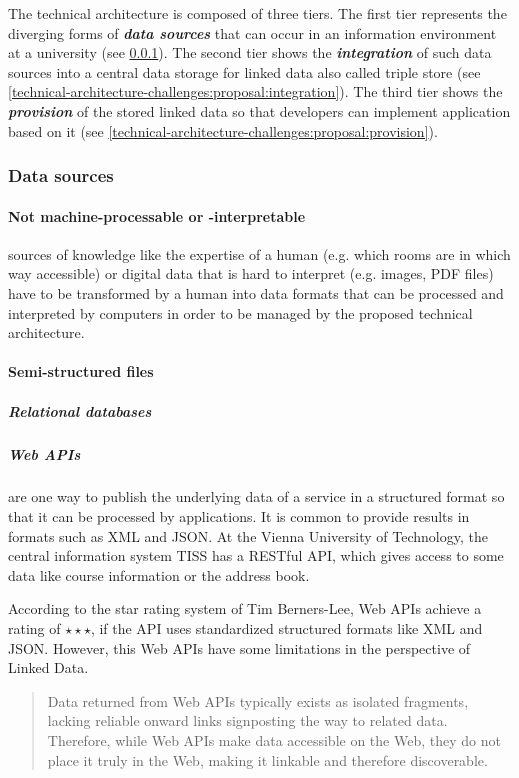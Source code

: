 \documentclass{article}
\begin{document}
The technical architecture is composed of three tiers. The first tier represents the diverging forms of \textbf{\textit{data sources}} that can occur in an information environment at a university (see \ref{technical-architecture-challenges:proposal:data-source}). The second tier shows the \textbf{\textit{integration}} of such data sources into a central data storage for linked data also called triple store (see \ref{technical-architecture-challenges:proposal:integration}). The third tier shows the \textbf{\textit{provision}} of the stored linked data so that developers can implement application based on it (see \ref{technical-architecture-challenges:proposal:provision}). 

\subsubsection{Data sources}
\label{technical-architecture-challenges:proposal:data-source}

\paragraph{Not machine-processable or -interpretable} sources of knowledge like the expertise of a human (e.g. which rooms are in which way accessible) or digital data that is hard to interpret (e.g. images, PDF files) have to be transformed by a human into data formats that can be processed and interpreted by computers in order to be managed by the proposed technical architecture.

\paragraph{Semi-structured files} 

\subparagraph{Relational databases}

\subparagraph{Web APIs} are one way to publish the underlying data of a service in a structured format so that it can be processed by applications. It is common to provide results in formats such as XML and JSON. At the Vienna University of Technology, the central information system TISS has a RESTful API, which gives access to some data like course information or the address book.

According to the star rating system of Tim Berners-Lee, Web APIs achieve a rating of $\star\star\star$, if the API uses standardized structured formats like XML and JSON. However, this Web APIs have some limitations in the perspective of Linked Data. \begin{quote}Data returned from Web APIs typically exists as isolated fragments, lacking reliable onward links signposting the way to related data. Therefore, while Web APIs make data accessible on the Web, they do not place it truly in the Web, making it linkable and therefore discoverable. \cite{heath_linked_2011} \end{quote} 
\end{document}
